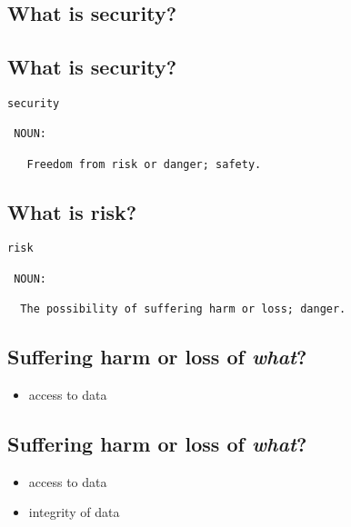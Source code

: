 \documentclass[xga]{xdvislides}
\begin{document}
%

\subsection{What is security?}

\subsection{What is security?}
\Huge
\begin{verbatim}
security

 NOUN:

   Freedom from risk or danger; safety.
\end{verbatim}
\Normalsize

\subsection{What is risk?}
\Huge
\begin{verbatim}
risk

 NOUN:

  The possibility of suffering harm or loss; danger.
\end{verbatim}
\Normalsize

\subsection{Suffering harm or loss of {\em what}?}

\begin{itemize}
	\item access to data
\end{itemize}

\subsection{Suffering harm or loss of {\em what}?}

\begin{itemize}
	\item access to data
	\item integrity of data
\end{itemize}
\end{document}
